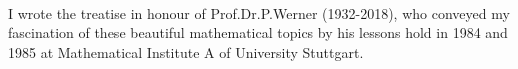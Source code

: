 \documentclass[11pt,twoside]{article}
\begin{document}
\paragraph{} %
I wrote the treatise in honour of Prof.\;Dr.\;P.\;Werner (1932-2018),
who conveyed my fascination of these beautiful mathematical topics
by his lessons hold in 1984 and 1985 at
Mathematical Institute A of University Stuttgart.

\fancyhead[OL,ER]{\small{(\thepage)}}

\setcounter{page}{0}
\newpage
\thispagestyle{empty}
\end{document}
